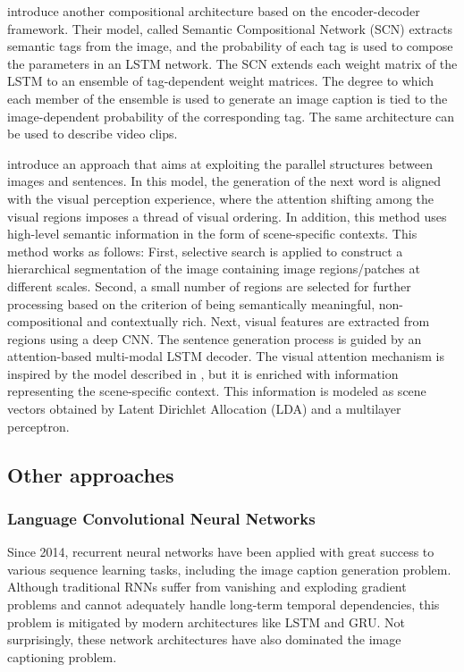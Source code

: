 \citet{Gan2017_SCN} introduce another compositional architecture based on the encoder-decoder framework. Their model, called Semantic Compositional Network (SCN) extracts semantic tags from the image, and the probability of each tag is used to compose the parameters in an LSTM network. The SCN extends each weight matrix of the LSTM to an ensemble of tag-dependent weight matrices. The degree to which each member of the ensemble is used to generate an image caption is tied to the image-dependent probability of the corresponding tag. The same architecture can be used to describe video clips.

\citet{Fu2017} introduce an approach that aims at exploiting the parallel structures between images and sentences. In this model, the generation of the next word is aligned with the visual perception experience, where the attention shifting among the visual regions imposes a thread of visual ordering. In addition, this method uses high-level semantic information in the form of scene-specific contexts. This method works as follows: First, selective search \citep{Uijlings2013} is applied to construct a hierarchical segmentation of the image containing image regions/patches at different scales. Second, a small number of regions are selected for further processing based on the criterion of being semantically meaningful, non-compositional and contextually rich. Next, visual features are extracted from regions using a deep CNN. The sentence generation process is guided by an attention-based multi-modal LSTM decoder. The visual attention mechanism is inspired by the model described in \citep{Xu2015}, but it is enriched with information representing the scene-specific context. This information is modeled as scene vectors obtained by Latent Dirichlet Allocation (LDA) \citep{Blei2003} and a multilayer perceptron.

\subsection{Other approaches}

\subsubsection{Language Convolutional Neural Networks}

Since 2014, recurrent neural networks have been applied with great success to various sequence learning tasks, including the image caption generation problem. Although traditional RNNs suffer from vanishing and exploding gradient problems and cannot adequately handle long-term temporal dependencies, this problem is mitigated by modern architectures like LSTM \cite{Hochreiter1997} and GRU\citep{Chung2014}. Not surprisingly, these network architectures have also dominated the image captioning problem. 

